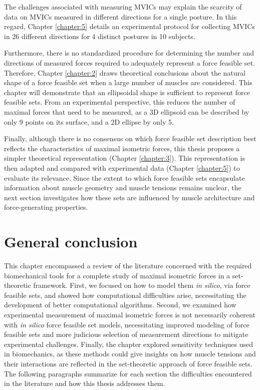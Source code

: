 The challenges associated with measuring MVICs may explain the scarcity of data on MVICs measured in different directions for a single posture. In this regard, Chapter \ref{chapter:5} details an experimental protocol for collecting MVICs in 26 different directions for 4 distinct postures in 10 subjects. 

Furthermore, there is no standardized procedure for determining the number and directions of measured forces required to adequately represent a force feasible set. Therefore, Chapter \ref{chapter:2} draws theoretical conclusions about the natural shape of a force feasible set when a large number of muscles are considered. This chapter will demonstrate that an ellipsoidal shape is sufficient to represent force feasible sets. From an experimental perspective, this reduces the number of maximal forces that need to be measured, as a 3D ellipsoid can be described by only 9 points on its surface, and a 2D ellipse by only 5. 

Finally, although there is no consensus on which force feasible set description best reflects the characteristics of maximal isometric forces, this thesis proposes a simpler theoretical representation (Chapter \ref{chapter:3}). This representation is then adapted and compared with experimental data (Chapter \ref{chapter:5}) to evaluate its relevance. Since the extent to which force feasible sets encapsulate information about muscle geometry and muscle tensions remains unclear, the next section investigates how these sets are influenced by muscle architecture and force-generating properties. 

\section{General conclusion}
This chapter encompassed a review of the literature concerned with the required biomechanical tools for a complete study of maximal isometric forces in a set-theoretic framework. First, we focused on how to model them \emph{in silico}, via force feasible sets, and showed how computational difficulties arise, necessitating the development of better computational algorithms. Second, we examined how experimental measurement of maximal isometric forces is not necessarily coherent with \emph{in silico} force feasible set models, necessitating improved modeling of force feasible sets and more judicious selection of measurement directions to mitigate experimental challenges. Finally, the chapter explored sensitivity techniques used in biomechanics, as these methods could give insights on how muscle tensions and their interactions are reflected in the set-theoretic approach of force feasible sets. The following paragraphs summarize for each section the difficulties encountered in the literature and how this thesis addresses them.


